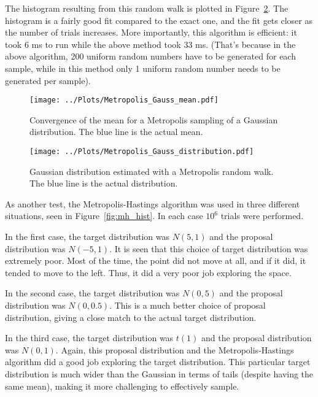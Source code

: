 \documentclass[twocolumn]{myarticle}
\begin{document}
The histogram resulting from this random walk is plotted in Figure~\ref{fig:metropolis_gauss_distribution}.
The histogram is a fairly good fit compared to the exact one, and the fit gets closer as the number of trials increases.
More importantly, this algorithm is efficient: it took 6 ms to run while the above method took 33 ms.
(That's because in the above algorithm, 200 uniform random numbers have to be generated for each sample, while in this method only 1 uniform random number needs to be generated per sample).

\begin{figure}[ht!]
    \begin{center}
    \texttt{[image: ../Plots/Metropolis\_Gauss\_mean.pdf]}
    \caption{%
        Convergence of the mean for a Metropolis sampling of a Gaussian distribution.
        The blue line is the actual mean.
    }
    \label{fig:metropolis_gauss_mean}
    \end{center}
\end{figure}

\begin{figure}[ht!]
    \begin{center}
    \texttt{[image: ../Plots/Metropolis\_Gauss\_distribution.pdf]}
    \caption{%
        Gaussian distribution estimated with a Metropolis random walk. 
        The blue line is the actual distribution.
    }
    \label{fig:metropolis_gauss_distribution}
    \end{center}
\end{figure}

As another test, the Metropolis-Hastings algorithm was used in three different situations, seen in Figure~\ref{fig:mh_hist}.
In each case $ 10^6 $ trials were performed.

In the first case, the target distribution was $ N(5,1) $ and the proposal distribution was $ N(-5,1) $.
It is seen that this choice of target distribution was extremely poor.
Most of the time, the point did not move at all, and if it did, it tended to move to the left.
Thus, it did a very poor job exploring the space.

In the second case, the target distribution was $ N(0,5) $ and the proposal distribution was $ N(0,0.5) $.
This is a much better choice of proposal distribution, giving a close match to the actual target distribution.

In the third case, the target distribution was $ t(1) $ and the proposal distribution was $ N(0,1) $.
Again, this proposal distribution and the Metropolis-Hastings algorithm did a good job exploring the target distribution.
This particular target distribution is much wider than the Gaussian in terms of tails (despite having the same mean), making it more challenging to effectively sample.
\end{document}
